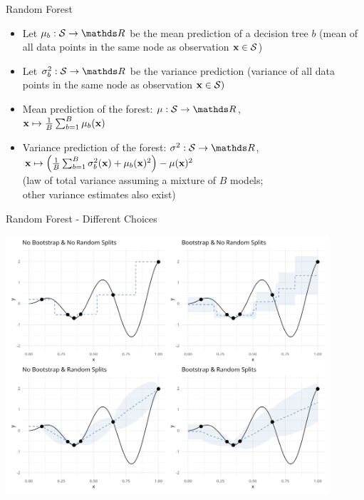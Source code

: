 \documentclass[11pt,compress,t,notes=noshow, xcolor=table]{beamer}
\begin{document}
\begin{frame}{Random Forest}

\begin{itemize}
    \item Let $\mu_b: \mathcal{S} \to \R$ be the mean prediction of a decision tree $b$ (mean of all data points in the same node as observation $\mathbf{x} \in \mathcal{S}$)
    \item Let $\sigma_{b}^2: \mathcal{S} \to \R$ be the variance prediction (variance of all data points in the same node as observation $\mathbf{x} \in \mathcal{S})$
    \item Mean prediction of the forest: $\mu: \mathcal{S} \to \R$,\\
    $\mathbf{x} \mapsto \frac{1}{B} \sum_{b = 1}^{B} \mu_{b}(\mathbf{x})$
    \item Variance prediction of the forest: $\sigma^{2}: \mathcal{S} \to \R$,\\
    $\mathbf{x} \mapsto  \left( \frac{1}{B} \sum_{b = 1}^{B} \sigma_{b}^2(\mathbf{x}) + \mu_{b}(\mathbf{x})^{2} \right) - \mu(\mathbf{x})^{2}$\\
    (law of total variance assuming a mixture of $B$ models;\\
    other variance estimates also exist)
\end{itemize}

\end{frame}


\begin{frame}{Random Forest - Different Choices}

\begin{center}
  \includegraphics[width = 0.9\textwidth]{figure_man/surrogate_2.png}\\
\end{center}

\end{frame}
\end{document}
